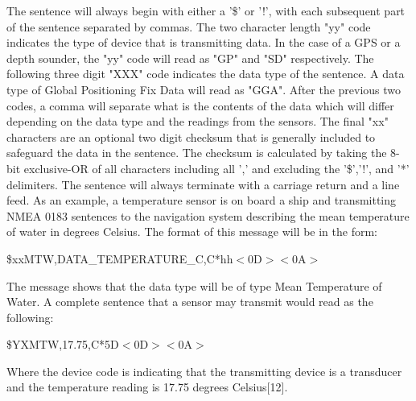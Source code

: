 \documentclass{report}
\begin{document}
The sentence will always begin with either a '\$' or '!', with each subsequent part of the sentence separated by commas. The two character length "yy" code indicates the type of device that is transmitting data. In the case of a GPS or a depth sounder, the "yy" code will read as "GP" and "SD" respectively. The following three digit "XXX" code indicates the data type of the sentence. A data type of Global Positioning Fix Data will read as "GGA". After the previous two codes, a comma will separate what is the contents of the data which will differ depending on the data type and the readings from the sensors. The final "xx" characters are an optional two digit checksum that is generally included to safeguard the data in the sentence. The checksum is calculated by taking the 8-bit exclusive-OR of all characters including all ',' and excluding the '\$','!', and '*' delimiters. The sentence will always terminate with a carriage return and a line feed.
\vspace{5mm} %
As an example, a temperature sensor is on board a ship and transmitting NMEA 0183 sentences to the navigation system describing the mean temperature of water in degrees Celsius. The format of this message will be in the form:  
\begin{center}
    \$xxMTW,DATA\_TEMPERATURE\_C,C*hh$<$0D$><$0A$>$
\end{center}
The message shows that the data type will be of type Mean Temperature of Water. A complete sentence that a sensor may transmit would read as the following:  
\begin{center}
    \$YXMTW,17.75,C*5D$<$0D$><$0A$>$
\end{center}

Where the device code is indicating that the transmitting device is a transducer and the temperature reading is 17.75 degrees Celsius[12].
\end{document}
